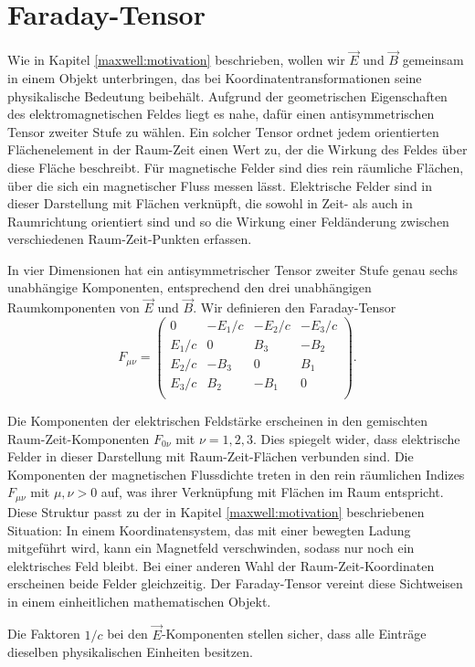 \section{Faraday-Tensor}
\label{maxwell:faraday}
Wie in Kapitel \ref{maxwell:motivation} beschrieben, wollen wir $\vec{E}$ und $\vec{B}$ gemeinsam in einem Objekt unterbringen, das bei Koordinatentransformationen seine physikalische Bedeutung beibehält. Aufgrund der geometrischen Eigenschaften des elektromagnetischen Feldes liegt es nahe, dafür einen antisymmetrischen Tensor zweiter Stufe zu wählen. Ein solcher Tensor ordnet jedem orientierten Flächenelement in der Raum-Zeit einen Wert zu, der die Wirkung des Feldes über diese Fläche beschreibt. Für magnetische Felder sind dies rein räumliche Flächen, über die sich ein magnetischer Fluss messen lässt. Elektrische Felder sind in dieser Darstellung mit Flächen verknüpft, die sowohl in Zeit- als auch in Raumrichtung orientiert sind und so die Wirkung einer Feldänderung zwischen verschiedenen Raum-Zeit-Punkten erfassen.

In vier Dimensionen hat ein antisymmetrischer Tensor zweiter Stufe genau sechs unabhängige Komponenten, entsprechend den drei unabhängigen Raumkomponenten von $\vec{E}$ und $\vec{B}$. Wir definieren den Faraday-Tensor
\[
F_{\mu\nu}
= 
\begin{pmatrix}
	0 & -E_1/c & -E_2/c & -E_3/c \\
	E_1/c &  0 &  B_3 & -B_2 \\
	E_2/c & -B_3 &  0 &  B_1 \\
	E_3/c &  B_2 & -B_1 &  0 \\
\end{pmatrix}.
\]

Die Komponenten der elektrischen Feldstärke erscheinen in den gemischten Raum-Zeit-Komponenten $F_{0\nu}$ mit $\nu=1,2,3$. Dies spiegelt wider, dass elektrische Felder in dieser Darstellung mit Raum-Zeit-Flächen verbunden sind. Die Komponenten der magnetischen Flussdichte treten in den rein räumlichen Indizes $F_{\mu\nu}$ mit $\mu,\nu>0$ auf, was ihrer Verknüpfung mit Flächen im Raum entspricht. Diese Struktur passt zu der in Kapitel \ref{maxwell:motivation} beschriebenen Situation: In einem Koordinatensystem, das mit einer bewegten Ladung mitgeführt wird, kann ein Magnetfeld verschwinden, sodass nur noch ein elektrisches Feld bleibt. Bei einer anderen Wahl der Raum-Zeit-Koordinaten erscheinen beide Felder gleichzeitig. Der Faraday-Tensor vereint diese Sichtweisen in einem einheitlichen mathematischen Objekt.

Die Faktoren $1/c$ bei den $\vec{E}$-Komponenten stellen sicher, dass alle Einträge dieselben physikalischen Einheiten besitzen.





